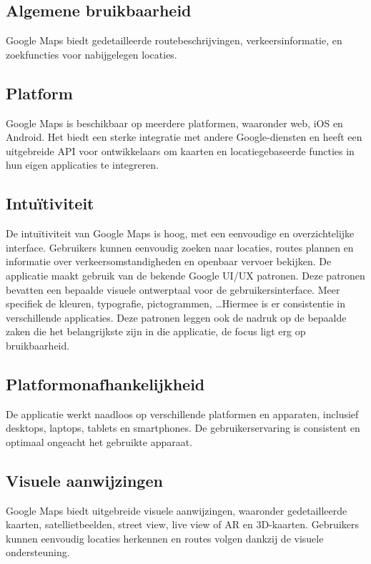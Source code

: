 \subsection*{Algemene bruikbaarheid}
Google Maps biedt gedetailleerde routebeschrijvingen, verkeersinformatie, en zoekfuncties voor nabijgelegen locaties.

\subsection*{Platform}
Google Maps is beschikbaar op meerdere platformen, waaronder web, iOS en Android. Het biedt een sterke integratie met andere Google-diensten en heeft een uitgebreide API voor ontwikkelaars om kaarten en locatiegebaseerde functies in hun eigen applicaties te integreren.

\subsection*{Intuïtiviteit}
De intuïtiviteit van Google Maps is hoog, met een eenvoudige en overzichtelijke interface. Gebruikers kunnen eenvoudig zoeken naar locaties, routes plannen en informatie over verkeersomstandigheden en openbaar vervoer bekijken. De applicatie maakt gebruik van de bekende Google UI/UX patronen. Deze patronen bevatten een bepaalde visuele ontwerptaal voor de gebruikersinterface. Meer specifiek de kleuren, typografie, pictogrammen, \ldots Hiermee is er consistentie in verschillende applicaties. Deze patronen leggen ook de nadruk op de bepaalde zaken die het belangrijkste zijn in die applicatie, de focus ligt erg op bruikbaarheid.

\subsection*{Platformonafhankelijkheid}
De applicatie werkt naadloos op verschillende platformen en apparaten, inclusief desktops, laptops, tablets en smartphones. De gebruikerservaring is consistent en optimaal ongeacht het gebruikte apparaat.

\subsection*{Visuele aanwijzingen}
Google Maps biedt uitgebreide visuele aanwijzingen, waaronder gedetailleerde kaarten, satellietbeelden, street view, live view of AR en 3D-kaarten. Gebruikers kunnen eenvoudig locaties herkennen en routes volgen dankzij de visuele ondersteuning.


